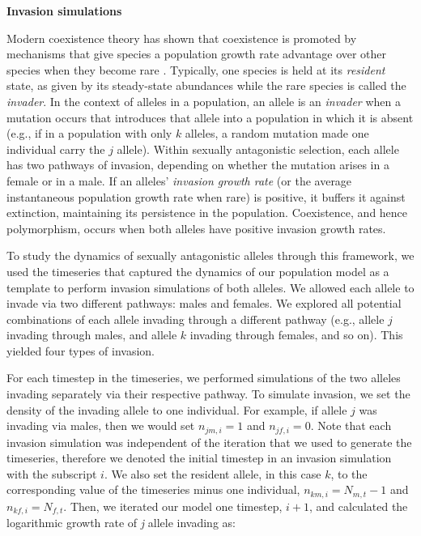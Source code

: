 \documentclass[12pt]{article}
\begin{document}
\vspace{5mm}
\noindent\textbf{Invasion simulations}

 Modern coexistence theory has shown that coexistence is promoted by mechanisms that give species a population growth rate advantage over other species when they become rare \citep{chesson_stabilizing_1982, chesson2003quantifying, barabas_chessons_2018}. Typically, one species is held at its \textit{resident} state, as given by its steady-state abundances while the rare species is called the \textit{invader}. In the context of alleles in a population, an allele is an \textit{invader} when a mutation occurs that introduces that allele into a population in which it is absent (e.g., if in a population with only $k$ alleles, a random mutation made one individual carry the $j$ allele). Within sexually antagonistic selection, each allele has two pathways of invasion, depending on whether the mutation arises in a female or in a male. If an alleles' \textit{invasion growth rate} (or the average instantaneous population growth rate when rare) is positive, it buffers it against extinction, maintaining its persistence in the population.  Coexistence, and hence polymorphism, occurs when both alleles have positive invasion growth rates.

To study the dynamics of sexually antagonistic alleles through this framework, we used the timeseries that captured the dynamics of our population model as a template to perform invasion simulations of both alleles. We allowed each allele to invade via two different pathways: males and females. We explored all potential combinations of each allele invading through a different pathway (e.g., allele $j$ invading through males, and allele $k$ invading through females, and so on). This yielded four types of invasion.

For each timestep in the timeseries, we performed simulations of the two alleles invading separately via their respective pathway. To simulate invasion, we set the density of the invading allele to one individual. For example, if allele $j$ was invading via males, then we would set $n_{jm,i} = 1$ and $n_{jf,i}= 0$. Note that each invasion simulation was independent of the iteration that we used to generate the timeseries, therefore we denoted the initial timestep in an invasion simulation with the subscript $i$. We also set the resident allele, in this case $k$, to the corresponding value of the timeseries minus one individual, $n_{km,i} = N_{m,t} -1$ and $n_{kf,i} = N_{f,t}$. Then, we iterated our model one timestep, $i+1$, and calculated the logarithmic growth rate of \textit{j} allele invading as:
\end{document}
